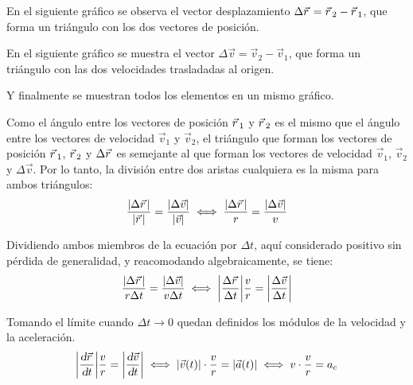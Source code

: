 \documentclass[a5paper,12pt,twoside]{book}
\begin{document}
En el siguiente gráfico se observa el vector desplazamiento $\Delta \vec{r}\hspace{0.05cm} = \vec{r}\hspace{0.05cm}_2-\vec{r}\hspace{0.05cm}_1$, que forma un triángulo con los dos vectores de posición.

\begin{center}
    \vspace{-6cm}
    \def\svgwidth{\linewidth}
    
    \vspace{-6cm}
\end{center}

En el siguiente gráfico se muestra el vector $\Delta \Vec{v} = \Vec{v}_2-\Vec{v}_1$, que forma un triángulo con las dos velocidades trasladadas al origen.

\begin{center}
    \vspace{-6cm}
    \def\svgwidth{\linewidth}
    
    \vspace{-6cm}
\end{center}

Y finalmente se muestran todos los elementos en un mismo gráfico.

\begin{center}
    \vspace{-6cm}
    \def\svgwidth{\linewidth}
    
    \vspace{-6cm}
\end{center}

Como el ángulo entre los vectores de posición $\vec{r}\hspace{0.05cm}_1$ y $\vec{r}\hspace{0.05cm}_2$ es el mismo que el ángulo entre los vectores de velocidad $\Vec{v}_1$ y $\Vec{v}_2$, el triángulo que forman los vectores de posición $\vec{r}\hspace{0.05cm}_1$, $\vec{r}\hspace{0.05cm}_2$ y $\Delta \vec{r}\hspace{0.05cm}$ es semejante al que forman los vectores de velocidad $\Vec{v}_1$, $\Vec{v}_2$ y $\Delta \Vec{v}$. Por lo tanto, la división entre dos aristas cualquiera es la misma para ambos triángulos:
\[
  \dfrac{{\left| {\Delta\vec{r}\hspace{0.05cm}} \right|}}{{\left| {\vec{r}\hspace{0.05cm}} \right|}} = \dfrac{{\left| {\Delta\Vec{v}} \right|}}{{\left| {\Vec{v}} \right|}}
  \iff
  \dfrac{{\left| {\Delta\vec{r}\hspace{0.05cm}} \right|}}{r} = \dfrac{{\left| {\Delta\Vec{v}} \right|}}{v}
\]

Dividiendo ambos miembros de la ecuación por $\Delta t$, aquí considerado positivo sin pérdida de generalidad, y reacomodando algebraicamente, se tiene:
\[
  \dfrac{{\left| {\Delta\vec{r}\hspace{0.05cm}} \right|}}{r \Delta t} = \dfrac{{\left| {\Delta \Vec{v}} \right|}}{v \Delta t}
  \iff
  {\left| {\dfrac{\Delta \vec{r}\hspace{0.05cm}}{\Delta t}} \right|} \dfrac{v}{r} = {\left| {\dfrac{\Delta \Vec{v}}{\Delta t}} \right|}
\]

Tomando el límite cuando $\Delta t \to 0$ quedan definidos los módulos de la velocidad y la aceleración.
\[
  {\left| {\dfrac{\textsl{d} \vec{r}\hspace{0.05cm}}{\textsl{d} t}} \right|} \dfrac{v}{r} = {\left| {\dfrac{\textsl{d} \Vec{v}}{\textsl{d} t}} \right|}
  \iff
  {\left| {\Vec{v}(t)} \right|} \cdot \dfrac{v}{r} = {\left| {\Vec{a}(t)} \right|}
  \iff
  v \cdot \dfrac{v}{r} = a_c
\]
\end{document}
